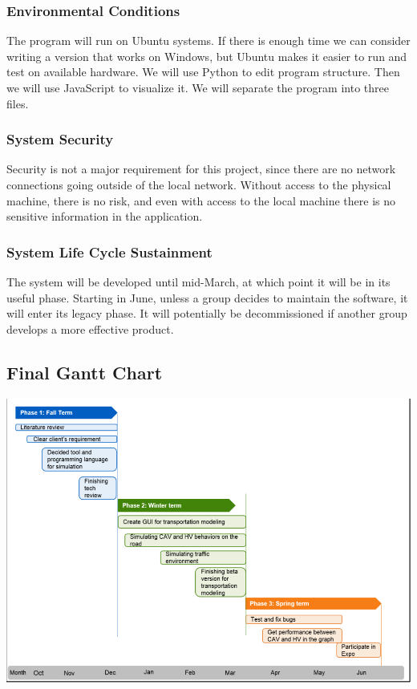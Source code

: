 \documentclass[onecolumn, draftclsnofoot,10pt, compsoc]{IEEEtran}
\begin{document}
\subsubsection{Environmental Conditions}
The program will run on Ubuntu systems.
If there is enough time we can consider writing a version that works on Windows, but Ubuntu makes it easier to run and test on available hardware.
We will use Python to edit program structure.
Then we will use JavaScript to visualize it.
We will separate the program into three files.
\subsubsection{System Security}
Security is not a major requirement for this project, since there are no network connections going outside of the local network.
Without access to the physical machine, there is no risk, and even with access to the local machine there is no sensitive information in the application.
\subsubsection{System Life Cycle Sustainment}
The system will be developed until mid-March, at which point it will be in its useful phase.
Starting in June, unless a group decides to maintain the software, it will enter its legacy phase.
It will potentially be decommissioned if another group develops a more effective product.
\subsection{Final Gantt Chart}
\includegraphics[width=6in]{ganttchart}
\newpage
\end{document}

